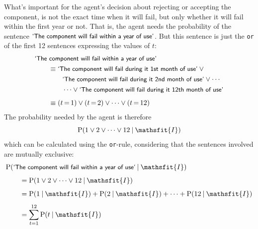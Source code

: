 \documentclass[
  a4paper,
  DIV=11,
  numbers=noendperiod,
  oneside]{scrreprt}
\begin{document}
What's important for the agent's decision about rejecting or accepting
the component, is not the exact time when it will fail, but only whether
it will fail within the first year or not. That is, the agent needs the
probability of the sentence
\(\textsf{\small`The component will fail within a year of use'}\). But
this sentence is just the \texttt{or} of the first 12 sentences
expressing the values of \(t\): \[
\begin{aligned}
&\textsf{\small`The component will fail within a year of use'}
\\&\qquad{}\equiv
\textsf{\small`The component will fail during it 1st month of use'}
\lor{}
\\&\qquad\qquad
\textsf{\small`The component will fail during it 2nd month of use'}
\lor \dotsb
\\&\qquad\qquad
\dotsb \lor
\textsf{\small`The component will fail during it 12th month of use'}
\\[1ex]&\qquad{}\equiv
(t\mathord{\,=\,}1) \lor (t\mathord{\,=\,}2) \lor \dotsb \lor (t\mathord{\,=\,}12)
\end{aligned}
\] The probability needed by the agent is therefore \[
\mathrm{P}(1 \lor 2 \lor \dotsb \lor 12\nonscript\:\vert\nonscript\:\mathopen{} \mathsfit{I})
\] which can be calculated using the \texttt{or}-rule, considering that
the sentences involved are mutually exclusive: \[
\begin{aligned}
&\mathrm{P}(\textsf{\small`The component will fail within a year of use'} \nonscript\:\vert\nonscript\:\mathopen{} \mathsfit{I}) 
\\[1ex]&\qquad{}=
\mathrm{P}(1 \lor 2 \lor \dotsb \lor 12\nonscript\:\vert\nonscript\:\mathopen{} \mathsfit{I})
\\[1ex]&\qquad{}=
\mathrm{P}(1 \nonscript\:\vert\nonscript\:\mathopen{}\mathsfit{I}) + \mathrm{P}(2 \nonscript\:\vert\nonscript\:\mathopen{}\mathsfit{I}) + \dotsb + \mathrm{P}(12 \nonscript\:\vert\nonscript\:\mathopen{}\mathsfit{I})
\\[1ex]&\qquad{}= \sum_{t=1}^{12} \mathrm{P}(t \nonscript\:\vert\nonscript\:\mathopen{} \mathsfit{I})
\end{aligned}
\]
\end{document}
